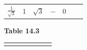 {{\begin{center}
\begin{tabular}[t]{|l|l|l|l|l|l|l|}
                \begin{math}\frac{1}{\sqrt{3}}\end{math}
               &
        1 &
                \begin{math}\sqrt{3}\end{math}
               &
                \begin{math}-\end{math}
               &
        0%
     \tabularnewline\cline{1-1}\cline{2-2}\cline{3-3}\cline{4-4}\cline{5-5}\cline{6-6}\cline{7-7}
    \end{tabular}
      \end{center}
    \begin{center}{\small\bfseries Table 14.3}\end{center}
          }{ %
        \begin{center}
      \label{m39408*id80733}
    \noindent
      \tablelasttail{}
      \begin{xtabular}[t]{|l|l|l|l|l|l|l|}\hline
         &

\end{xtabular}
\end{center}}}
